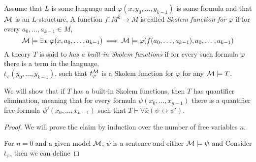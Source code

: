 \question{}
Assume that $L$ is some language and $\varphi(x, y_0, \ldots, y_{k - 1})$ is some formula and that $\mathcal{M}$ is an $L$-structure,
A function $f : M^k \to M$ is called \textit{Skolem function for $\varphi$} if for every $a_0, \ldots, a_{k - 1} \in M$,
\[
	\mathcal{M} \models \exists x\ \varphi(x, a_0, \ldots, a_{k - 1})
	\implies \mathcal{M} \models \varphi(f(a_0, \ldots, a_{k - 1}), a_0, \ldots, a_{k - 1})
\]
A theory $T$ is said to \textit{has a built-in Skolem functions} if for every such formula $\varphi$ there is a term in the language, \\
$t_{\varphi}(y_0, \ldots, y_{k - 1})$, such that $t_\varphi^{\mathcal{M}}$ is a Skolem function for $\varphi$ for any $\mathcal{M} \models T$.

\subquestion{}
We will show that if $T$ has a built-in Skolem functions, then $T$ has quantifier elimination,
meaning that for every formula $\psi(x_0, \ldots, x_{n - 1})$ there is a quantifier free formula $\psi'(x_0, \ldots, x_{n - 1})$ such that $T \vdash \forall \bar{x} (\psi \leftrightarrow \psi')$.
\begin{proof}
	We will prove the claim by induction over the number of free variables $n$.

	For $n = 0$ and a given model $\mathcal{M}$, $\psi$ is a sentence and either $\mathcal{M} \models \psi$ and
	Consider $t_{\psi}$, then we can define 
\end{proof}


